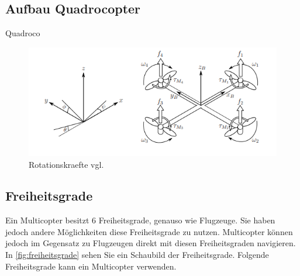
\subsection{Aufbau Quadrocopter}

Quadroco
\begin{figure}
    \begin{centering}
        \includegraphics[scale=0.6]{images/inertial_body_frames.png}
        \caption{\label{fig:frames}Rotationskraefte vgl. \cite{luukkonen2011modelling}}
    \end{centering}
\end{figure}


\subsection{Freiheitsgrade}

Ein Multicopter besitzt 6 Freiheitsgrade, genauso wie Flugzeuge. Sie haben jedoch andere Möglichkeiten diese Freiheitsgrade zu nutzen.
Multicopter können jedoch im Gegensatz zu Flugzeugen direkt mit diesen Freiheitsgraden navigieren. In \ref{fig:freiheitsgrade} sehen Sie ein Schaubild der Freiheitsgrade.
Folgende Freiheitsgrade kann ein Multicopter verwenden.

